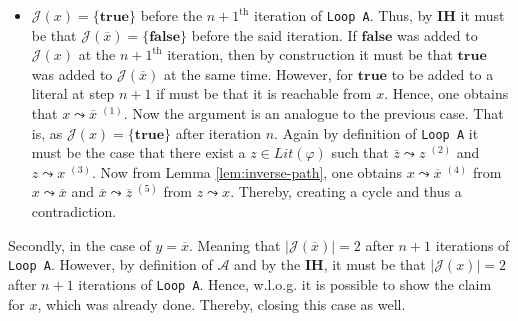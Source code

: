 \documentclass [11pt]{article}
\newcommand{\True}{\mathbf{true}}
\newcommand{\False}{\mathbf{false}}
\newcommand{\lit}{\mathit{Lit}}
\newcommand{\reach}{\leadsto}
\begin{document}
\begin{itemize}
\item $\mathcal{J}(x)=\{\True\}$ before the $n+1^{\text{th}}$ iteration of \texttt{Loop A}. Thus, by \textbf{IH} it must be that $\mathcal{J}(\overline{x})=\{\False\}$ before the said iteration. If $\False$ was added to $\mathcal{J}(x)$ at the $n+1^{\text{th}}$ iteration, then by construction it must be that $\True$ was added to $\mathcal{J}(\overline{x})$ at the same time. However, for $\True$ to be added to a literal at step $n+1$ if must be that it is reachable from $x$. Hence, one obtains that $x \reach \overline{x}\;^{(1)}$. 
Now the argument is an analogue to the previous case. That is, as $\mathcal{J}(x)=\{\True\}$ after iteration $n$. Again by definition of \texttt{Loop A}  it must be the case that there exist a $z\in \lit(\varphi)$ such that $\overline{z} \reach z\;^{(2)}$ and $z \reach x\;^{(3)}$. Now from Lemma \ref{lem:inverse-path}, one obtains $x \reach \overline{x}\;^{(4)}$ from $x \reach \overline{x}$ and  $\overline{x} \reach \overline{z}\;^{(5)}$ from $z \reach x$. Thereby, creating a cycle and thus a contradiction.

\begin{center}
\end{center}
\end{itemize}
\noindent
Secondly, in the case of $y=\overline{x}$. Meaning that $|\mathcal{J}(\overline{x})|=2$ after $n+1$ iterations of \texttt{Loop A}. However, by definition of $\mathcal{A}$ and by the \textbf{IH}, it must be that $|\mathcal{J}(x)|=2$ after $n+1$ iterations of \texttt{Loop A}.
Hence, w.l.o.g. it is possible to show the claim for $x$, which was already done. Thereby, closing this case as well.
\end{document}
